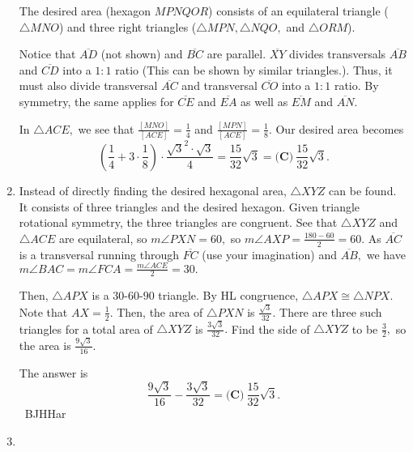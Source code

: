 \documentclass{article}%
\begin{document}
\begin{enumerate}
The desired area (hexagon $MPNQOR$) consists of an equilateral triangle ($\triangle MNO$) and three right triangles ($\triangle MPN,\triangle NQO,$ and $\triangle ORM$).

Notice that $\overline {AD}$ (not shown) and $\overline {BC}$ are parallel. $\overline {XY}$ divides transversals $\overline {AB}$ and $\overline {CD}$ into a $1:1$ ratio (This can be shown by similar triangles.). Thus, it must also divide transversal $\overline {AC}$ and transversal $\overline {CO}$ into a $1:1$ ratio. By symmetry, the same applies for $\overline {CE}$ and $\overline {EA}$ as well as $\overline {EM}$ and $\overline {AN}.$

In $\triangle ACE,$ we see that $\frac{[MNO]}{[ACE]} = \frac{1}{4}$ and $\frac{[MPN]}{[ACE]} = \frac{1}{8}.$ Our desired area becomes \[\left(\frac{1}{4}+3 \cdot \frac{1}{8}\right) \cdot \frac{\sqrt{3}^2 \cdot \sqrt{3}}{4} = \frac {15}{32}\sqrt{3} = \boxed{\textbf{(C)}\ \frac {15}{32}\sqrt{3}}.\]

%
\item%
Instead of directly finding the desired hexagonal area, $\triangle XYZ$ can be found. It consists of three triangles and the desired hexagon. Given triangle rotational symmetry, the three triangles are congruent. See that $\triangle XYZ$ and $\triangle ACE$ are equilateral, so $m\angle PXN=60,$ so $m\angle AXP = \frac{180-60}{2}=60.$ As $\overline {AC}$ is a transversal running through $\overline {FC}$ (use your imagination) and $\overline {AB},$ we have $m\angle BAC=m\angle FCA = \frac{m\angle ACE}{2}=30.$

Then, $\triangle APX$ is a $30$-$60$-$90$ triangle. By HL congruence, $\triangle APX \cong \triangle NPX.$ Note that $AX=\frac{1}{2}.$ Then, the area of $\triangle PXN$ is $\frac{\sqrt{3}}{32}.$ There are three such triangles for a total area of $\triangle XYZ$ is $\frac{3\sqrt{3}}{32}.$ Find the side of $\triangle XYZ$ to be $\frac{3}{2},$ so the area is $\frac{9\sqrt{3}}{16}.$

The answer is \[\frac{9\sqrt{3}}{16}-\frac{3\sqrt{3}}{32}=\boxed{\textbf{(C)}\ \frac {15}{32}\sqrt{3}}.\]
~BJHHar

%
\item%


\end{enumerate}
\end{document}
